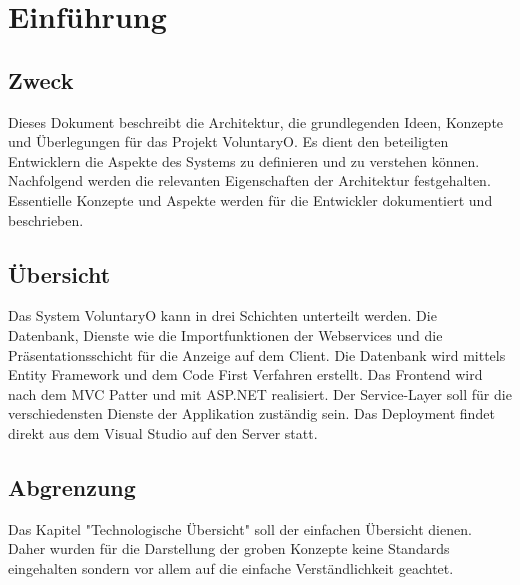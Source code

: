 \chapter{Einführung}
	\section{Zweck}
	Dieses Dokument beschreibt die Architektur, die grundlegenden Ideen, Konzepte und Überlegungen für das Projekt VoluntaryO. Es dient den beteiligten Entwicklern die Aspekte des Systems zu definieren und zu verstehen können.
	Nachfolgend werden die relevanten Eigenschaften der Architektur festgehalten. Essentielle Konzepte und Aspekte werden für die Entwickler dokumentiert und beschrieben.
	
	\section{Übersicht}
	Das System VoluntaryO kann in drei Schichten unterteilt werden. Die Datenbank, Dienste wie die Importfunktionen der Webservices und die Präsentationsschicht für die Anzeige auf dem Client.
	Die Datenbank wird mittels Entity Framework und dem Code First Verfahren erstellt. Das Frontend wird nach dem MVC Patter und mit ASP.NET realisiert. Der Service-Layer soll für die verschiedensten Dienste der Applikation zuständig sein.
	Das Deployment findet direkt aus dem Visual Studio auf den Server statt.

	\section{Abgrenzung}
	Das Kapitel "Technologische Übersicht" soll der einfachen Übersicht dienen. Daher wurden für die Darstellung der groben Konzepte keine Standards eingehalten sondern vor allem auf die einfache Verständlichkeit geachtet.
